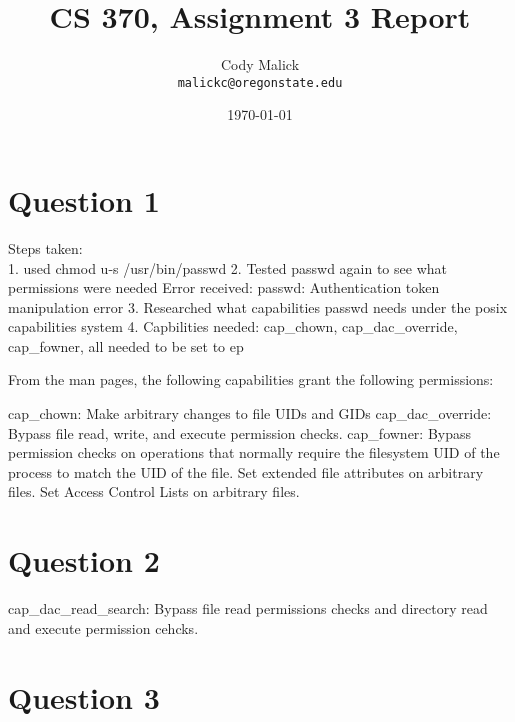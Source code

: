 \documentclass[10pt,letterpaper]{article}
\begin{document}
\title{CS 370, Assignment 3 Report}
\author{Cody Malick\\
\texttt{malickc@oregonstate.edu}}
\date{\today}
\maketitle

\section*{Question 1}
Steps taken:\\
1. used chmod u-s /usr/bin/passwd
2. Tested passwd again to see what permissions were needed
Error received: passwd: Authentication token manipulation error
3. Researched what capabilities passwd needs under the posix capabilities system
4. Capbilities needed: cap_chown, cap_dac_override, cap_fowner, all needed to be
set to ep

From the man pages, the following capabilities grant the following permissions:

cap_chown: Make arbitrary changes to file UIDs and GIDs
cap_dac_override: Bypass file read, write, and execute permission checks.
cap_fowner: Bypass permission checks on operations that normally require the
	filesystem UID of the process to match the UID of the file. Set
	extended file attributes on arbitrary files. Set Access Control Lists
	on arbitrary files.

\section*{Question 2}

cap_dac_read_search: Bypass file read permissions checks and directory read and
	execute permission cehcks.
\section*{Question 3}
\end{document}
